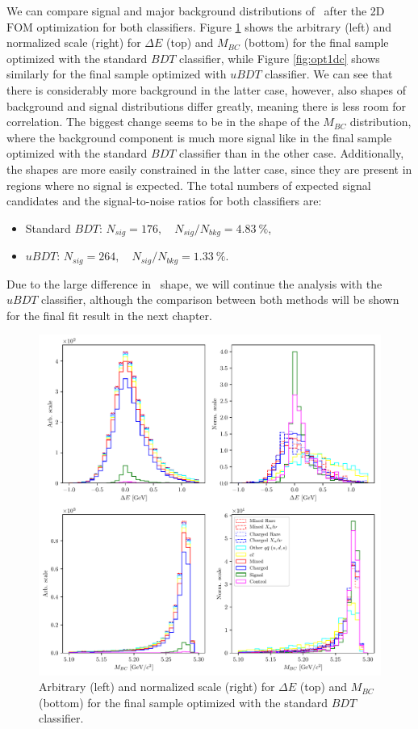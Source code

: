We can compare signal and major background distributions of \vars~after the 2D $\mathrm{FOM}$ optimization for both classifiers. Figure \ref{fig:opt01c} shows the arbitrary (left) and normalized scale (right) for $\Delta E$ (top) and $M_{BC}$ (bottom) for the final sample optimized with the standard $BDT$ classifier, while Figure \ref{fig:opt1dc} shows similarly for the final sample optimized with $uBDT$ classifier. We can see that there is considerably more background in the latter case, however, also shapes of background and signal distributions differ greatly, meaning there is less room for correlation. The biggest change seems to be in the shape of the $M_{BC}$ distribution, where the background component is much more signal like in the final sample optimized with the standard $BDT$ classifier than in the other case.  Additionally, the shapes are more easily constrained in the latter case, since they are present in regions where no signal is expected. The total numbers of expected signal candidates and the signal-to-noise ratios for both classifiers are:
\begin{itemize}
	\item Standard $BDT$: $N_{sig} = 176,\quad N_{sig}/N_{bkg} = 4.83~\%$,
	\item $uBDT$: $N_{sig} = 264,\quad N_{sig}/N_{bkg} = 1.33~\%$.
\end{itemize}
Due to the large difference in \vars~shape, we will continue the analysis with the $uBDT$ classifier, although the comparison between both methods will be shown for the final fit result in the next chapter.

\begin{figure}[H]
	\centering
	\captionsetup{width=0.8\linewidth}
	\includegraphics[width=\linewidth]{fig/opt_BB}
	\caption{Arbitrary (left) and normalized scale (right) for $\Delta E$ (top) and $M_{BC}$ (bottom) for the final sample optimized with the standard $BDT$ classifier.}
	\label{fig:opt01c}
\end{figure} 

